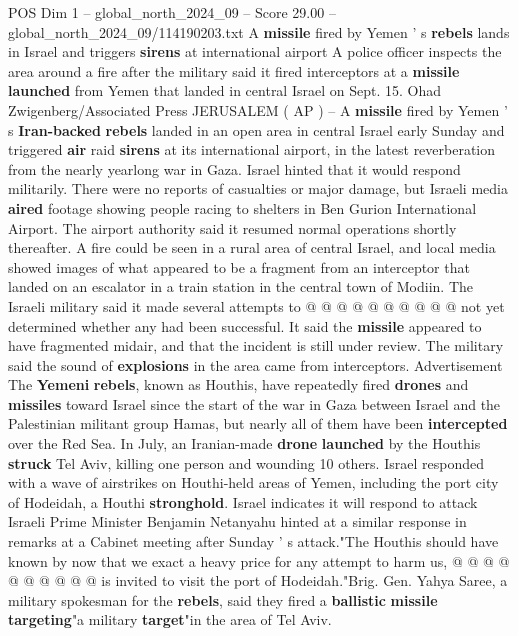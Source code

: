 \begin{textsample}{POS Dim 1 – global\_north\_2024\_09 – Score 29.00 – global\_north\_2024\_09/114190203.txt}  \label{ex:f1_pos_097}
A \textbf{missile} fired by Yemen ' s \textbf{rebels} lands in Israel and triggers \textbf{sirens} at international airport A police officer inspects the area around a fire after the military said it fired interceptors at a \textbf{missile} \textbf{launched} from Yemen that landed in central Israel on Sept. 15.
Ohad Zwigenberg/Associated Press JERUSALEM ( AP ) -- A \textbf{missile} fired by Yemen ' s \textbf{Iran-backed} \textbf{rebels} landed in an open area in central Israel early Sunday and triggered \textbf{air} raid \textbf{sirens} at its international airport, in the latest reverberation from the nearly yearlong war in Gaza.
Israel hinted that it would respond militarily.
There were no reports of casualties or major damage, but Israeli media \textbf{aired} footage showing people racing to shelters in Ben Gurion International Airport.
The airport authority said it resumed normal operations shortly thereafter.
A fire could be seen in a rural area of central Israel, and local media showed images of what appeared to be a fragment from an interceptor that landed on an escalator in a train station in the central town of Modiin.
The Israeli military said it made several attempts to @ @ @ @ @ @ @ @ @ @ not yet determined whether any had been successful.
It said the \textbf{missile} appeared to have fragmented midair, and that the incident is still under review.
The military said the sound of \textbf{explosions} in the area came from interceptors.
Advertisement The \textbf{Yemeni} \textbf{rebels}, known as Houthis, have repeatedly fired \textbf{drones} and \textbf{missiles} toward Israel since the start of the war in Gaza between Israel and the Palestinian militant group Hamas, but nearly all of them have been \textbf{intercepted} over the Red Sea.
In July, an Iranian-made \textbf{drone} \textbf{launched} by the Houthis \textbf{struck} Tel Aviv, killing one person and wounding 10 others.
Israel responded with a wave of airstrikes on Houthi-held areas of Yemen, including the port city of Hodeidah, a Houthi \textbf{stronghold}.
Israel indicates it will respond to attack Israeli Prime Minister Benjamin Netanyahu hinted at a similar response in remarks at a Cabinet meeting after Sunday ' s attack."The Houthis should have known by now that we exact a heavy price for any attempt to harm us, @ @ @ @ @ @ @ @ @ @ is invited to visit the port of Hodeidah."Brig.
Gen.
Yahya Saree, a military spokesman for the \textbf{rebels}, said they fired a \textbf{ballistic} \textbf{missile} \textbf{targeting}"a military \textbf{target}"in the area of Tel Aviv.

\end{textsample}
